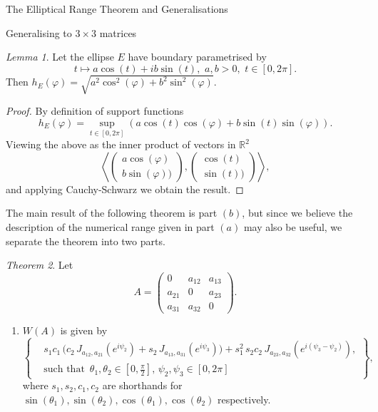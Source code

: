 \documentclass[12pt]{article}
\theoremstyle{plain}
\theoremstyle{definition}
\theoremstyle{remark}
\renewcommand{\phi}{\varphi}
\newtheorem{Theorem}{Theorem}[section]
\newtheorem{Lemma}[Theorem]{Lemma}
\numberwithin{equation}{section}
\begin{document}
\begin{section}{The Elliptical Range Theorem and Generalisations}
\begin{subsection}{Generalising to $3 \times 3$ matrices}
\begin{Lemma}\label{ellipsesupport}
    Let the ellipse $E$ have boundary parametrised by 
    $$
    t \mapsto a \cos (t) + i b \sin (t) , \, \, a,b >0, \, \, t \in [0,2 \pi].
    $$ Then $ h_E(\phi) = \sqrt{a^2\cos^2(\phi) + b^2\sin^2(\phi)}$.
\end{Lemma}
    
\begin{proof}
By definition of support functions $$ h_E(\phi) = \sup_{t \in [0, 2\pi]} (a\cos(t)\cos(\phi) + b\sin(t)\sin(\phi)) .$$
Viewing the above as the inner product of vectors in $\mathbb{R}^2$
$$
\left\langle \begin{pmatrix}
    a \cos(\phi) \\
    b\sin(\phi))
\end{pmatrix},  \begin{pmatrix}
     \cos(t) \\
    \sin(t))
\end{pmatrix} \right\rangle,
$$
and applying Cauchy-Schwarz we obtain the result.
\end{proof}


The main result of the following theorem is part $(b)$, but since we believe the description of the numerical range given in part $(a)$ may also be useful, we separate the theorem into two parts.


\begin{Theorem}\label{3by3J}
    Let \begin{equation}\label{Athmain}
        A =  \begin{pmatrix}
        0 & a_{12} & a_{13} \\
        a_{21} & 0 & a_{23} \\
        a_{31} & a_{32} & 0
    \end{pmatrix}.
    \end{equation}
\begin{enumerate}
    \item $W(A)$ is given by
\begin{equation}\label{finalJ3by3}
\left\{
  \begin{aligned}
  & s_1c_1 \,\Big(
c_2 \, J_{a_{12},a_{21}}(e^{i\psi_2}) + s_2 \, J_{a_{13},a_{31}}(e^{i\psi_3})
\Big) + s_1^2 \, s_2c_2 \, J_{a_{23},a_{32}}(e^{i(\psi_3-\psi_2)}) ,\\
  &  \text{such that }\,  \theta_1, \theta_2 \in \left[0, \frac{\pi}{2}\right], \, \psi_2, \psi_3 \in \left[0, 2 \pi\right]
  \end{aligned}
\right\},
\end{equation}
where $s_1, s_2, c_1, c_2$ are shorthands for $\sin ( \theta_1), \sin ( \theta_2), \cos( \theta_1), \cos( \theta_2)$ respectively.




\end{enumerate}
\end{Theorem}
\end{subsection}
\end{section}
\end{document}
